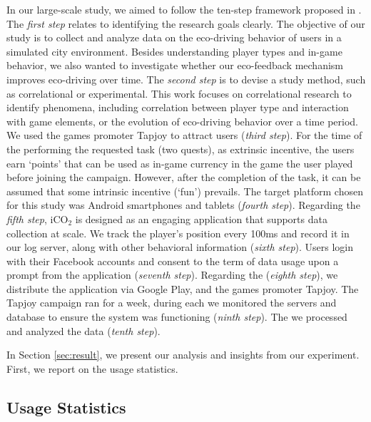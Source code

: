 \documentclass[preprint,authoryear,12pt]{elsarticle}
\begin{document}
In our large-scale study, we aimed to follow the ten-step framework proposed in \citep{Henze2013}.
The {\itshape first step\/} relates to identifying the research goals clearly. The objective of our study is to collect and analyze data on the eco-driving behavior of users in a simulated city environment. Besides understanding player types and in-game behavior, we also wanted to investigate whether our eco-feedback mechanism improves eco-driving over time. The {\itshape second step\/} is to devise a study method, such as correlational or experimental. This work focuses on correlational research to identify phenomena, including correlation between player type and interaction with game elements, or the evolution of eco-driving behavior over a time period. We used the games promoter Tapjoy to attract users ({\itshape third step}). For the time of the performing the requested task (two quests),   as extrinsic incentive, the users earn `points' that can be used as in-game currency in the game the user played before joining the campaign. However, after the completion of the task, it can be assumed that some intrinsic incentive (`fun') prevails.
The target platform chosen for this study was Android smartphones and tablets ({\itshape fourth step}). Regarding the {\itshape fifth step}, iCO$_2$ is designed as an engaging application that supports data collection at scale. We track the player's position every 100ms and record it in our log server, along with other behavioral information ({\itshape sixth step}). Users login with their Facebook accounts and consent to the term of data usage upon a prompt from the application ({\itshape seventh step}). Regarding the ({\itshape eighth step}), we distribute the application via Google Play, and the games promoter Tapjoy.
The Tapjoy campaign ran for a week, during each we monitored the servers and database to ensure the system was functioning ({\itshape ninth step}). The we processed and analyzed the data ({\itshape tenth step}).

In Section \ref{sec:result}, we present our analysis and insights from our experiment. First, we report on the usage statistics.


\subsection{Usage Statistics}
\label{subsec:usage_stats}

\end{document}
